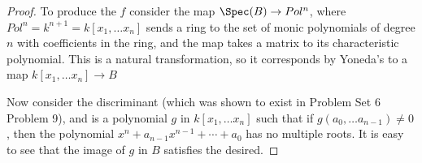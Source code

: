 \documentclass[12 pt]{article}
\theoremstyle{definition}
\begin{document}
\begin{proof}
To produce the $f$ consider the map $\Spec(B) \to Pol^n$, where $Pol^n=k^{n+1}=k[x_1, \ldots x_{n}]$ sends a ring to the set of monic polynomials of degree $n$ with coefficients in the ring, and the map takes a matrix to its characteristic polynomial. This is a natural transformation, so it corresponds by Yoneda's to a map $k[x_1, \ldots x_n] \to B$

Now consider the discriminant (which was shown to exist in Problem Set 6 Problem 9), and is a polynomial $g$ in $k[x_1, \ldots x_{n}]$ such that if $g(a_0, \ldots a_{n-1}) \neq 0$, then the polynomial $x^n+a_{n-1}x^{n-1}+\cdots+a_0$ has no multiple roots. It is easy to see that the image of $g$ in $B$ satisfies the desired.


\end{proof}
\end{document}
